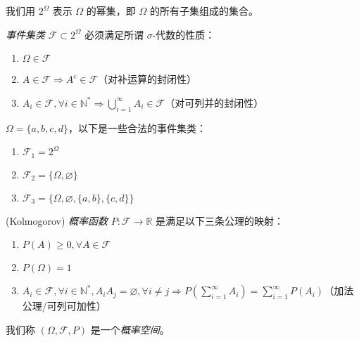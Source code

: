 \documentclass[../main.tex]{subfiles}
\begin{document}
我们用 $2^\Omega$ 表示 $\Omega$ 的幂集，即 $\Omega$ 的所有子集组成的集合。

\begin{definition}\label{def:1.5.1}
    \emph{事件集类} $\mathcal{F}\subset 2^\Omega$ 必须满足所谓 $\sigma$-代数的性质：
    \begin{enumerate}
        \item $\Omega\in\mathcal{F}$
        \item $A\in\mathcal{F}\Rightarrow A^c\in\mathcal{F}$（对补运算的封闭性）
        \item $A_i\in\mathcal{F},\forall i\in\mathbb{N}^*\Rightarrow \bigcup_{i=1}^\infty A_i\in\mathcal{F}$（对可列并的封闭性）
    \end{enumerate}
\end{definition}

\begin{example}
    $\Omega=\{a,b,c,d\}$，以下是一些合法的事件集类：
    \begin{enumerate}
        \item $\mathcal{F}_1=2^\Omega$
        \item $\mathcal{F}_2=\{\Omega,\varnothing\}$
        \item $\mathcal{F}_3=\{\Omega,\varnothing,\{a,b\},\{c,d\}\}$
    \end{enumerate}
\end{example}

\begin{definition}\label{def:1.5.2}
    (Kolmogorov) \emph{概率函数} $P:\mathcal{F}\rightarrow\mathbb{R}$ 是满足以下三条公理的映射：
    \begin{enumerate}
        \item $P(A)\geq 0,\forall A\in\mathcal{F}$
        \item $P(\Omega)=1$
        \item $A_i\in\mathcal{F},\forall i\in\mathbb{N}^*,A_iA_j=\varnothing,\forall i\neq j\Rightarrow P(\sum_{i=1}^\infty A_i)=\sum_{i=1}^\infty P(A_i)$（加法公理/可列可加性）
    \end{enumerate}
    我们称 $(\Omega,\mathcal{F},P)$ 是一个\emph{概率空间}。
\end{definition}
\end{document}
